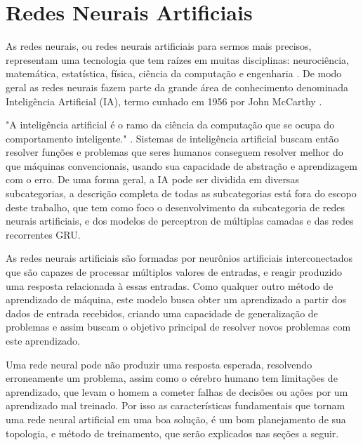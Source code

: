 \section{Redes Neurais Artificiais}

As redes neurais, ou redes neurais artificiais  para sermos mais precisos, representam uma tecnologia que tem raízes em muitas disciplinas: neurociência, matemática, estatística, física, ciência da computação e engenharia \cite{Haykin1994}. 
De modo geral as redes neurais fazem parte da grande área de conhecimento denominada Inteligência Artificial (IA), termo cunhado em 1956 por John McCarthy \cite{kaplan2019siri}.


"A inteligência artificial é o ramo da ciência da computação que se ocupa do comportamento inteligente." \cite{Luger2004}. Sistemas de inteligência artificial buscam então resolver funções e problemas que seres humanos conseguem resolver melhor do que máquinas convencionais, usando sua capacidade de abstração e aprendizagem com o erro. De uma forma geral, a IA pode ser dividida em diversas subcategorias, a descrição completa de todas as subcategorias está fora do escopo deste trabalho, que tem como foco o desenvolvimento da subcategoria de redes neurais artificiais, e dos modelos de perceptron de múltiplas camadas e das redes recorrentes GRU.


As redes neurais artificiais são formadas por neurônios artificiais interconectados que são capazes de processar múltiplos valores de entradas, e reagir produzido uma resposta relacionada à essas entradas. Como qualquer outro método de aprendizado de máquina, este modelo busca obter um aprendizado a partir dos dados de entrada recebidos, criando uma capacidade de generalização de problemas e assim buscam o objetivo principal de resolver novos problemas com este aprendizado.

Uma rede neural pode não produzir uma resposta esperada, resolvendo erroneamente um problema, assim como o cérebro humano tem limitações de aprendizado, que levam o homem a cometer falhas de decisões ou ações por um aprendizado mal treinado. Por isso as características fundamentais que tornam uma rede neural artificial em uma boa solução, é um bom planejamento de sua topologia, e método de treinamento, que serão explicados nas seções a seguir.

